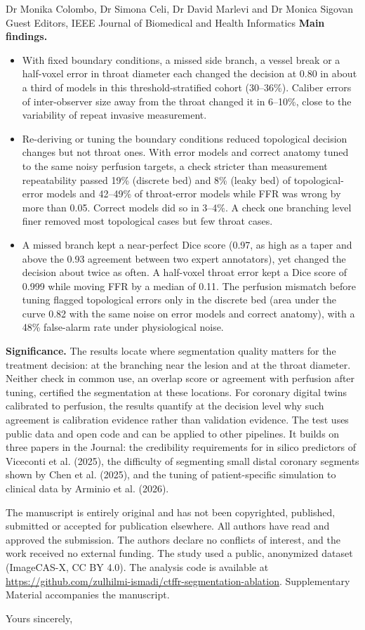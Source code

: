 \documentclass[10pt]{letter}
\begin{document}
\begin{letter}{Dr Monika Colombo, Dr Simona Celi, Dr David Marlevi and Dr Monica Sigovan\\Guest Editors, IEEE Journal of Biomedical and Health Informatics}
\textbf{Main findings.}
\begin{itemize}[nosep,leftmargin=1.2em]
\item With fixed boundary conditions, a missed side branch, a vessel break or a half-voxel error in throat diameter each changed the decision at 0.80 in about a third of models in this threshold-stratified cohort (30--36\%). Caliber errors of inter-observer size away from the throat changed it in 6--10\%, close to the variability of repeat invasive measurement.
\item Re-deriving or tuning the boundary conditions reduced topological decision changes but not throat ones. With error models and correct anatomy tuned to the same noisy perfusion targets, a check stricter than measurement repeatability passed 19\% (discrete bed) and 8\% (leaky bed) of topological-error models and 42--49\% of throat-error models while FFR was wrong by more than 0.05. Correct models did so in 3--4\%. A check one branching level finer removed most topological cases but few throat cases.
\item A missed branch kept a near-perfect Dice score (0.97, as high as a taper and above the 0.93 agreement between two expert annotators), yet changed the decision about twice as often. A half-voxel throat error kept a Dice score of 0.999 while moving FFR by a median of 0.11. The perfusion mismatch before tuning flagged topological errors only in the discrete bed (area under the curve 0.82 with the same noise on error models and correct anatomy), with a 48\% false-alarm rate under physiological noise.
\end{itemize}

\textbf{Significance.} The results locate where segmentation quality matters for the treatment decision: at the branching near the lesion and at the throat diameter. Neither check in common use, an overlap score or agreement with perfusion after tuning, certified the segmentation at these locations. For coronary digital twins calibrated to perfusion, the results quantify at the decision level why such agreement is calibration evidence rather than validation evidence. The test uses public data and open code and can be applied to other pipelines. It builds on three papers in the Journal: the credibility requirements for in silico predictors of Viceconti et al. (2025), the difficulty of segmenting small distal coronary segments shown by Chen et al. (2025), and the tuning of patient-specific simulation to clinical data by Arminio et al. (2026).

The manuscript is entirely original and has not been copyrighted, published, submitted or accepted for publication elsewhere. All authors have read and approved the submission. The authors declare no conflicts of interest, and the work received no external funding. The study used a public, anonymized dataset (ImageCAS-X, CC BY 4.0). The analysis code is available at \url{https://github.com/zulhilmi-ismadi/ctffr-segmentation-ablation}. Supplementary Material accompanies the manuscript.

\closing{Yours sincerely,}
\end{letter}
\end{document}

